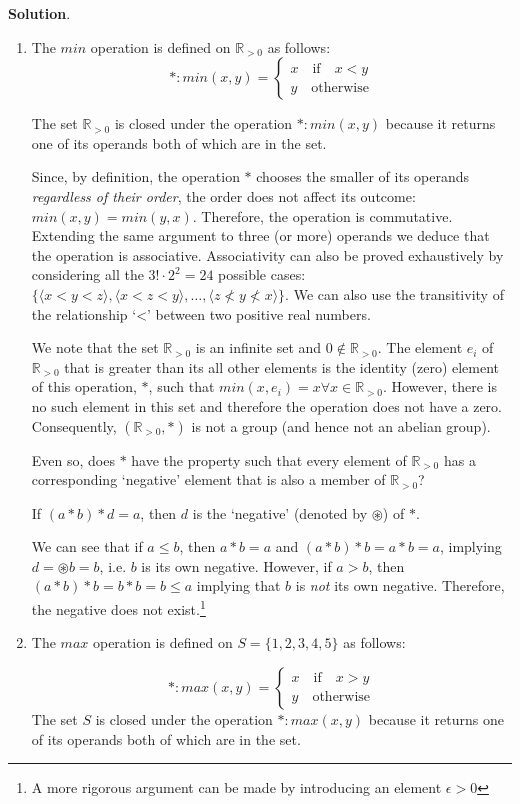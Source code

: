 \documentclass[english,notitlepage,smartquotes]{hgbreport}
\theoremstyle{definition}
\theoremstyle{definition}
\theoremstyle{remark}
\theoremstyle{definition}
\theoremstyle{plain}
\theoremstyle{definition}
\begin{document}
\textbf{Solution}.
\begin{enumerate}
\item The $min$ operation is defined on $\mathbb R_{>0}$ as follows:
$$
*: min(x,y)=
\begin{cases}
x\quad\text{if}\quad x<y\\
y\quad \text{otherwise}
\end{cases}
$$

The set $\mathbb R_{>0}$ is closed under the operation $*:min(x,y)$ because it returns one of its operands both of which are in the set.

Since, by definition, the operation $*$ chooses the smaller of its operands \emph{regardless of their order}, the order does not affect its outcome: $min(x,y)=min(y,x)$. Therefore, the operation is commutative. Extending the same argument to three (or more) operands we deduce that the operation is associative. Associativity can also be proved exhaustively by considering all the $3!\cdot 2^2=24$ possible cases: $\{\langle x<y<z\rangle,\langle x<z<y\rangle,\dots,\langle z\nless y \nless x\rangle\}$. We can also use the transitivity of the relationship `<' between two positive real numbers.

We note that the set $\mathbb R_{>0}$ is an infinite set and $0\not\in\mathbb R_{>0}$. The element $e_i$ of $\mathbb R_{>0}$ that is greater than its all other elements is the identity (zero) element of this operation, $*$, such that $min(x, e_i)=x\forall x\in\mathbb R_{>0}$. However, there is no such element in this set and therefore the operation does not have a zero. Consequently, $(\mathbb R_{>0},*)$ is not a group (and hence not an abelian group).

Even so, does $*$ have the property such that every element of $\mathbb R_{>0}$ has a corresponding `negative' element that is also a member of $\mathbb R_{>0}$?

If $(a*b)*d=a$, then $d$ is the `negative' (denoted by $\circledast$) of $*$.

We can see that if $a\leq b$, then $a*b=a$ and $(a*b)*b=a*b=a$, implying $d=\circledast b=b$, i.e. $b$ is its own negative. However, if $a>b$, then $(a*b)*b=b*b=b\leq a$ implying that $b$ is \emph{not} its own negative. Therefore, the negative does not exist.\footnote{A more rigorous argument can be made by introducing an element $\epsilon>0$}
\item The $max$ operation is defined on $S=\{1,2,3,4,5\}$ as follows:

$$
*: max(x,y)=
\begin{cases}
x\quad\text{if}\quad x>y\\
y\quad \text{otherwise}
\end{cases}
$$
The set $S$ is closed under the operation $*:max(x,y)$ because it returns one of its operands both of which are in the set.


\end{enumerate}
\end{document}
